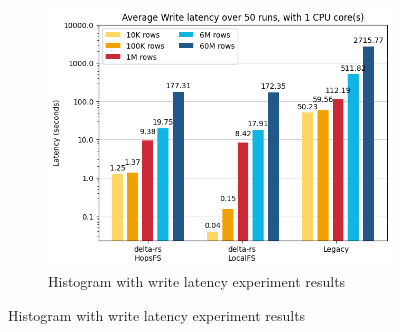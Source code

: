 \begin{figure}
    \centering
    \begin{subfigure}[b]{\textwidth}
        \includegraphics[width=\textwidth]{figures/5-results/write/write_time_1_core.png}
        \caption{Histogram with write latency experiment results}
        \label{fig:res_write_time}
    \end{subfigure}
    

\end{figure}
